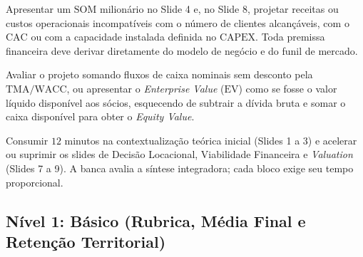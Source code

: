 \begin{boxErro}
Apresentar um $\text{SOM}$ milionário no Slide 4 e, no Slide 8, projetar receitas ou custos operacionais incompatíveis com o número de clientes alcançáveis, com o $\text{CAC}$ ou com a capacidade instalada definida no $\text{CAPEX}$. Toda premissa financeira deve derivar diretamente do modelo de negócio e do funil de mercado.
\end{boxErro}

\begin{boxErro}
Avaliar o projeto somando fluxos de caixa nominais sem desconto pela $\text{TMA}/\text{WACC}$, ou apresentar o \textit{Enterprise Value} ($\text{EV}$) como se fosse o valor líquido disponível aos sócios, esquecendo de subtrair a dívida bruta e somar o caixa disponível para obter o \textit{Equity Value}.
\end{boxErro}

\begin{boxErro}
Consumir $12$ minutos na contextualização teórica inicial (Slides 1 a 3) e acelerar ou suprimir os slides de Decisão Locacional, Viabilidade Financeira e \textit{Valuation} (Slides 7 a 9). A banca avalia a síntese integradora; cada bloco exige seu tempo proporcional.
\end{boxErro}


\subsection*{Nível 1: Básico (Rubrica, Média Final e Retenção Territorial)}

